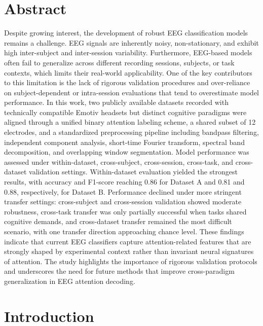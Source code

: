 \documentclass[10pt,letterpaper]{article}
\begin{document}
\section*{Abstract}
Despite growing interest, the development of robust EEG classification models remains a challenge. EEG signals are inherently noisy, non-stationary, and exhibit high inter-subject and inter-session variability. Furthermore, EEG-based models often fail to generalize across different recording sessions, subjects, or task contexts, which limits their real-world applicability. One of the key contributors to this limitation is the lack of rigorous validation procedures and over-reliance on subject-dependent or intra-session evaluations that tend to overestimate model performance. In this work, two publicly available datasets recorded with technically compatible Emotiv headsets but distinct cognitive paradigms were aligned through a unified binary attention labeling scheme, a shared subset of 12 electrodes, and a standardized preprocessing pipeline including bandpass filtering, independent component analysis, short-time Fourier transform, spectral band decomposition, and overlapping window segmentation. Model performance was assessed under within-dataset, cross-subject, cross-session, cross-task, and cross-dataset validation settings. Within-dataset evaluation yielded the strongest results, with accuracy and F1-score reaching 0.86 for Dataset A and 0.81 and 0.88, respectively, for Dataset B. Performance declined under more stringent transfer settings: cross-subject and cross-session validation showed moderate robustness, cross-task transfer was only partially successful when tasks shared cognitive demands, and cross-dataset transfer remained the most difficult scenario, with one transfer direction approaching chance level. These findings indicate that current EEG classifiers capture attention-related features that are strongly shaped by experimental context rather than invariant neural signatures of attention. The study highlights the importance of rigorous validation protocols and underscores the need for future methods that improve cross-paradigm generalization in EEG attention decoding.

\clearpage
{}
\linenumbers

\section*{Introduction}
\end{document}
